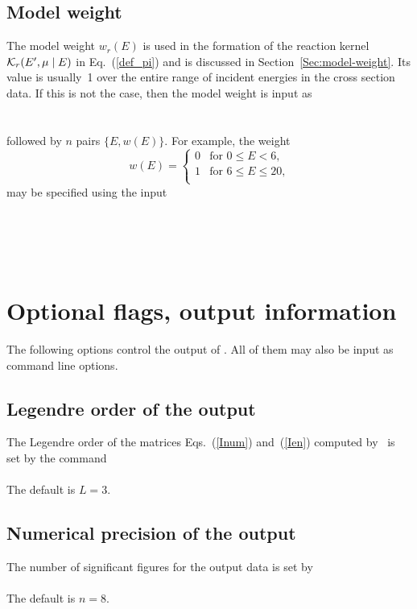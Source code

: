 \subsection{Model weight}
The model weight $w_r(E)$ is used in the formation of the reaction
kernel ${\cal K}_r(E', \mu \mid E)$ in Eq.~(\ref{def_pi}) and is
discussed in Section~\ref{Sec:model-weight}.  Its value
is usually~1 over the entire range of incident energies in the cross
section data.  If this is not the case, then the model weight is input as\\
  \\
  \\
followed by $n$ pairs $\{E, w(E)\}$.   For example, the weight
$$
  w(E) = \begin{cases}
    0 & \text{for $0 \le E < 6$,}\\
    1 & \text{for $6 \le E \le 20$,}\\
  \end{cases}
$$
may be specified using the input\\
   \\
  \\
  \\
  \\
  
\section{Optional flags, output information}
\label{Sec:usage-optional}
The following options control the output of \gettransfer.
All of them may also be input as command line options.

\subsection{Legendre order of the output}\label{Sec:LegendreOrder}
The Legendre order of the matrices Eqs.~(\ref{Inum}) and~(\ref{Ien})
computed by \gettransfer\ is set by the command\\
  \\
The default is $L = 3$.

\subsection{Numerical precision of the output}
The number of significant figures for the output data is set by\\
  \\
The default is $n = 8$.

